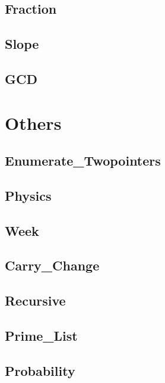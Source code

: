     \subsection{Fraction}
            
    \subsection{Slope}
            
    \subsection{GCD}
            

\section{Others}
    \subsection{Enumerate_Twopointers}
            
    \subsection{Physics}
            
    \subsection{Week}
            
    \subsection{Carry_Change}
            
    \subsection{Recursive}
            
    \subsection{Prime_List}
            
    \subsection{Probability}
            

